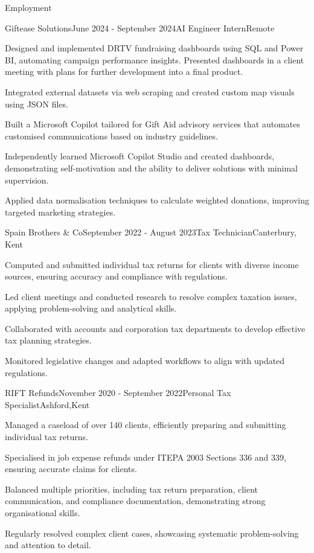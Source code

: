 \documentclass[
	11pt, %
]{resume} %
\begin{document}
\begin{rSection}{Employment}

	\begin{rSubsection}{Giftease Solutions}{June 2024 - September 2024}{AI Engineer Intern}{Remote}
		\item Designed and implemented DRTV fundraising dashboards using SQL and Power BI, automating campaign performance insights. Presented dashboards in a client meeting with plans for further development into a final product.
		\item Integrated external datasets via web scraping and created custom map visuals using JSON files.
        \item Built a Microsoft Copilot tailored for Gift Aid advisory services that automates customised communications based on industry guidelines. 
        \item Independently learned Microsoft Copilot Studio and created dashboards, demonstrating self-motivation and the ability to deliver solutions with minimal supervision.
        \item Applied data normalisation techniques to calculate weighted donations, improving targeted marketing strategies.
	\end{rSubsection}


	\begin{rSubsection}{Spain Brothers \& Co}{September 2022 - August 2023}{Tax Technician}{Canterbury, Kent}
		\item Computed and submitted individual tax returns for clients with diverse income sources, ensuring accuracy and compliance with regulations.
		\item Led client meetings and conducted research to resolve complex taxation issues, applying problem-solving and analytical skills.
		\item Collaborated with accounts and corporation tax departments to develop effective tax planning strategies.
		\item Monitored legislative changes and adapted workflows to align with updated regulations.
	\end{rSubsection}


	\begin{rSubsection}{RIFT Refunds}{November 2020 - September 2022}{Personal Tax Specialist}{Ashford,Kent}
		\item Managed a caseload of over 140 clients, efficiently preparing and submitting individual tax returns.
		\item Specialised in job expense refunds under ITEPA 2003 Sections 336 and 339, ensuring accurate claims for clients.
		\item Balanced multiple priorities, including tax return preparation, client communication, and compliance documentation, demonstrating strong organisational skills.
        \item Regularly resolved complex client cases, showcasing systematic problem-solving and attention to detail.
	\end{rSubsection}


\end{rSection}
\end{document}
